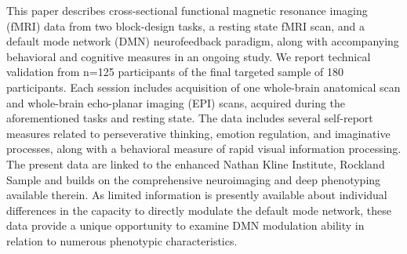 This paper describes cross-sectional functional magnetic resonance imaging (fMRI) data from two block-design tasks, a resting state fMRI scan, and a default mode network (DMN) neurofeedback paradigm, along with accompanying behavioral and cognitive measures in an ongoing study. We report technical validation from n=125 participants of the final targeted sample of 180 participants. Each session includes acquisition of one whole-brain anatomical scan and whole-brain echo-planar imaging (EPI) scans, acquired during the aforementioned tasks and resting state. The data includes several self-report measures related to perseverative thinking, emotion regulation, and imaginative processes, along with a behavioral measure of rapid visual information processing. The present data are linked to the enhanced Nathan Kline Institute, Rockland Sample and builds on the comprehensive neuroimaging and deep phenotyping available therein. As limited information is presently available about individual differences in the capacity to directly modulate the default mode network, these data provide a unique opportunity to examine DMN modulation ability in relation to numerous phenotypic characteristics. 